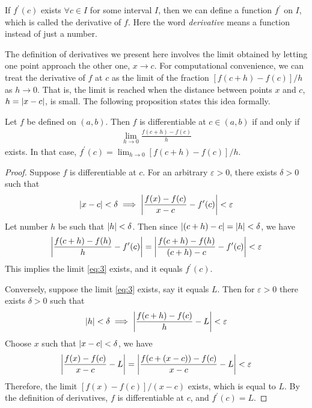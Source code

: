 \documentclass[thmcnt=section, 12pt]{my-elegantbook}
\begin{document}
If $f^\prime(c)$ exists $\forall c \in I$ for some interval $I$, then we can define a function $f^\prime$ on $I$, which is called the derivative of $f$. Here the word \textit{derivative} means a function instead of just a number.


The definition of derivatives we present here involves the limit obtained by letting one point approach the other one, $x \to c$. For computational convenience, we can treat the derivative of $f$ at $c$ as the limit of the fraction $[ f(c+h) - f(c) ] / h$ as $h \to 0$. That is, the limit is reached when the distance between points $x$ and $c$, $h = \left\lvert x-c \right\rvert$, is small. The following proposition states this idea formally.

\begin{proposition} \label{pro:1}
    Let $f$ be defined on $(a, b)$. Then $f$ is differentiable at $c \in (a, b)$ if and only if
    \begin{align}
        \lim_{h \to 0} \frac{f(c+h) - f(c)}{h}
        \label{eq:3}
    \end{align}
    exists. In that case, $f^\prime(c) = \lim_{h \to 0} [ f(c+h) - f(c) ] / h$.
\end{proposition}

\begin{proof}
    Suppose $f$ is differentiable at $c$. For an arbitrary $\varepsilon > 0$, there exists $\delta > 0$ such that
    \begin{align*}
        \left\lvert x - c \right\rvert < \delta
        \implies \left\lvert \frac{f(x) - f(c)}{x - c} - f^\prime(c) \right\rvert < \varepsilon
    \end{align*}
    Let number $h$ be such that $\left\lvert h \right\rvert < \delta$. Then since $\left\lvert (c+h) - c \right\rvert = \left\lvert h \right\rvert < \delta$, we have
    \begin{align*}
        \left\lvert \frac{f(c+h) - f(h)}{h} - f^\prime(c) \right\rvert
        = \left\lvert \frac{f(c+h) - f(h)}{(c+h) - c} - f^\prime(c) \right\rvert < \varepsilon
    \end{align*}
    This implies the limit \eqref{eq:3} exists, and it equals $f^\prime(c)$.

    Conversely, suppose the limit \eqref{eq:3} exists, say it equals $L$. Then for $\varepsilon > 0$ there exists $\delta > 0$ such that
    \begin{align*}
        \left\lvert h \right\rvert < \delta
        \implies \left\lvert \frac{f(c+h) - f(c)}{h} - L \right\rvert < \varepsilon
    \end{align*}
    Choose $x$ such that $\left\lvert x - c \right\rvert < \delta$, we have
    \begin{align*}
        \left\lvert 
            \frac{f(x) - f(c)}{x - c} - L
         \right\rvert = \left\lvert 
            \frac{f(c + (x - c)) - f(c)}{x - c} - L
         \right\rvert < \varepsilon
    \end{align*}
    Therefore, the limit $[f(x) - f(c)]/(x - c)$ exists, which is equal to $L$. By the definition of derivatives, $f$ is differentiable at $c$, and $f^\prime(c) = L$.
\end{proof}
\end{document}
